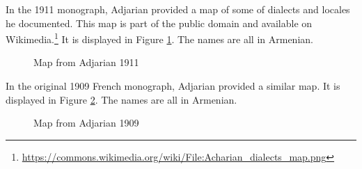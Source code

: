 In the 1911 monograph, Adjarian provided a map of some of dialects and locales he documented. This map is part of the public domain and available on Wikimedia.\footnote{\url{https://commons.wikimedia.org/wiki/File:Acharian_dialects_map.png}} It is displayed in Figure \ref{map:Adjarian1911}. The names are all in Armenian. 

\begin{figure}[H]
	\caption{Map from Adjarian 1911}
\label{map:Adjarian1911}
\end{figure}




In the original 1909 French monograph, Adjarian provided a similar map. It   is displayed in Figure \ref{map:Adjarian1909}. The names are all in Armenian. 

\begin{figure}[H]
	\caption{Map from Adjarian 1909}
	\label{map:Adjarian1909}
\end{figure}

